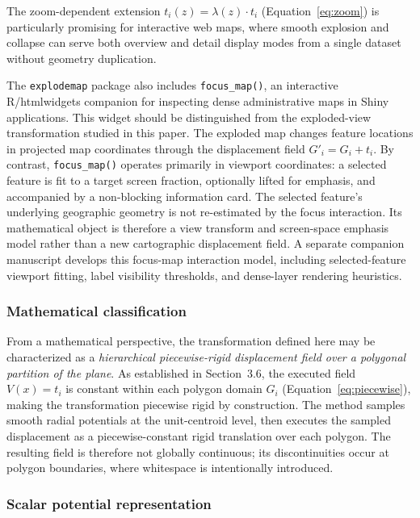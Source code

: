 \documentclass[12pt, a4paper]{article}
\numberwithin{equation}{section}
\begin{document}
The zoom-dependent extension $t_i(z) = \lambda(z) \cdot t_i$ (Equation~\ref{eq:zoom}) is particularly promising for interactive web maps, where smooth explosion and collapse can serve both overview and detail display modes from a single dataset without geometry duplication.

The \texttt{explodemap} package also includes \texttt{focus\_map()}, an interactive \textsf{R}/htmlwidgets companion for inspecting dense administrative maps in Shiny applications. This widget should be distinguished from the exploded-view transformation studied in this paper. The exploded map changes feature locations in projected map coordinates through the displacement field $G'_i = G_i + t_i$. By contrast, \texttt{focus\_map()} operates primarily in viewport coordinates: a selected feature is fit to a target screen fraction, optionally lifted for emphasis, and accompanied by a non-blocking information card. The selected feature's underlying geographic geometry is not re-estimated by the focus interaction. Its mathematical object is therefore a view transform and screen-space emphasis model rather than a new cartographic displacement field. A separate companion manuscript develops this focus-map interaction model, including selected-feature viewport fitting, label visibility thresholds, and dense-layer rendering heuristics.

\subsubsection*{Mathematical classification}

From a mathematical perspective, the transformation defined here may be characterized as a \emph{hierarchical piecewise-rigid displacement field over a polygonal partition of the plane}. As established in Section~3.6, the executed field $V(x) = t_i$ is constant within each polygon domain $G_i$ (Equation~\eqref{eq:piecewise}), making the transformation piecewise rigid by construction. The method samples smooth radial potentials at the unit-centroid level, then executes the sampled displacement as a piecewise-constant rigid translation over each polygon. The resulting field is therefore not globally continuous; its discontinuities occur at polygon boundaries, where whitespace is intentionally introduced.

\subsubsection*{Scalar potential representation}
\end{document}
